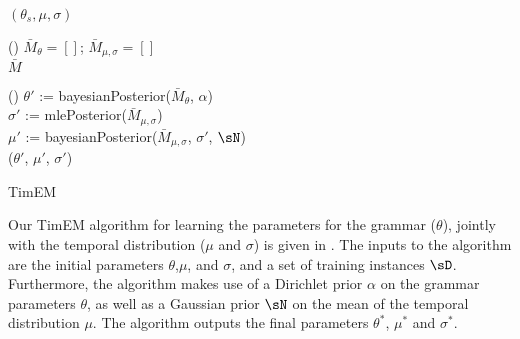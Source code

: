 \begin{algorithm}[t]
	\BlankLine

	\KwRet $(\theta_s,\mu,\sigma)$ \\
	\BlankLine
	\BlankLine

	\Begin(\estep{$\sD$,$\theta$,$\mu$,$\sigma$}){
		$\bar M_\theta = []$; $\bar M_{\mu,\sigma} = []$ \\
		\KwRet $\bar M$ \\
	}
	\BlankLine
	\BlankLine
	
	\Begin(){
		$\theta'$ := bayesianPosterior($\bar M_\theta$, $\alpha$) \\
		$\sigma'$ := mlePosterior($\bar M_{\mu,\sigma}$) \\
		$\mu'$ := bayesianPosterior($\bar M_{\mu,\sigma}$, $\sigma'$, $\sN$) \\
		\KwRet ($\theta'$, $\mu'$, $\sigma'$) \\
	}
	\caption{
		\label{alg:pseudocode}
		TimEM 
	}
\end{algorithm}

Our TimEM algorithm for learning the parameters for the grammar ($\theta$),
	jointly with the temporal distribution ($\mu$ and $\sigma$) is given 
	in .
The inputs to the algorithm are the initial parameters $\theta$,$\mu$, and
	$\sigma$, and a set of training instances $\sD$.
Furthermore, the algorithm makes use of a Dirichlet prior $\alpha$ on 
	the grammar parameters $\theta$, as well as a Gaussian prior $\sN$ on the
	mean of the temporal distribution $\mu$.
The algorithm outputs the final parameters $\theta^*$, $\mu^*$ and $\sigma^*$.


